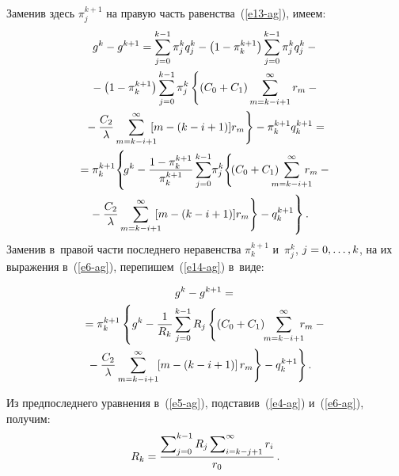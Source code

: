 \begin{multicols}{2}
  Заменив здесь $\pi_j^{k+1}$ на правую часть равенства~(\ref{e13-ag}), имеем:
  \begin{multline}
  g^k - g^{k+1} =\sum\limits_{j=0}^{k-1} \pi_j^k q_j^k - \left(1-\pi_k^{k+1}\right) 
\sum\limits_{j=0}^{k-1} \pi_j^k q_j^k-{}\\
  {}-\left( 1-\pi_k^{k+1}\right) \sum\limits_{j=0}^{k-1} \pi_j^k \left\{ \left( 
C_0+C_1\right) \sum\limits_{m=k-i+1}^\infty r_m-{}\right.\\
  \left.{}- \fr{C_2}{\lambda} \sum\limits^\infty_{m=k-i+1}\hspace*{-2mm} [m-(k-i+1)]r_m\right\} 
-\pi_k^{k+1} q_k^{k+1}={}\\
  {}=\pi_k^{k+1} \!\left\{ \!g^k-\fr{1-\pi_k^{k+1}}{\pi_k^{k+1}} 
\sum\limits_{j=0}^{k-1} \!\pi_j^k \!\left\{ \!\left( C_0+C_1\right)\hspace*{-3mm}
 \sum\limits_{m=k-i+1}^\infty\hspace*{-3mm} r_m -{}\right.\right.\hspace*{-0.3pt}\\
  \left.\left.\hspace*{-5mm}{}- \fr{C_2}{\lambda} \sum\limits_{m=k-i+1}^\infty
  \hspace*{-2mm} [m-(k-i+1)]r_m\right\} -q_k^{k+1}
  \vphantom{\fr{1-\pi_k^{k+1}}{\pi_k^{k+1}} \left\{\sum\limits_{j=0}^{k-1}\right\}}
  \right\}.
  \label{e14-ag}
  \end{multline}
    Заменив в~правой части последнего неравенства $\pi_k^{k+1}$ и~$\pi_j^k$, 
$j\hm= 0,\ldots, k$, на их выражения в~(\ref{e6-ag}), перепишем~(\ref{e14-ag}) 
в~виде:

\noindent
  \begin{multline}
  g^k-g^{k+1} ={}\\
  {}=\pi_k^{k+1} \left\{ g^k -\fr{1}{R_k} \sum\limits_{j=0}^{k-1} R_j 
\left\{ \left( C_0+C_1\right) \hspace*{-1mm}\sum\limits_{m=k-i+1}^\infty \hspace*{-2mm}r_m -{}\right.\right.\\
  \left.\left.\hspace*{-5mm}{}- \fr{C_2}{\lambda} \sum\limits_{m=k-i+1}^\infty 
  \hspace*{-1mm}\left[ m-(k-
i+1)\right] r_m \right\} -q_k^{k+1}\right\}.
  \label{e15-ag}
  \end{multline}
  
  Из предпоследнего уравнения в~(\ref{e5-ag}), подставив~(\ref{e4-ag}) и~(\ref{e6-ag}),
  получим:
  \begin{equation}
  R_k = \displaystyle\frac{\displaystyle \sum\nolimits_{j=0}^{k-1} R_j \sum\nolimits_{i=k-j+1}^\infty 
r_i\mathstrut}{\displaystyle r_0\mathstrut}\,.
  \label{e16-ag}
  \end{equation}
  

\end{multicols}
